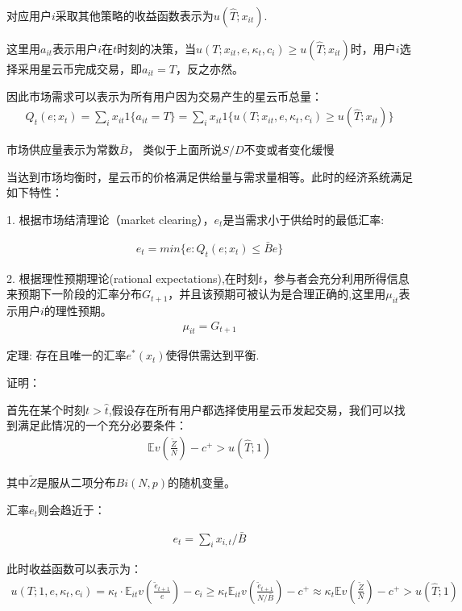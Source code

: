 对应用户$i$采取其他策略的收益函数表示为$u(\widehat{T};x_{it})$.

这里用$a_{it}$表示用户$i$在$t$时刻的决策，当$u(T;x_{it},e,\kappa_t,c_i)\geq u(\widehat{T};x_{it})$时，用户$i$选择采用星云币完成交易，即$a_{it}=T$，反之亦然。


因此市场需求可以表示为所有用户因为交易产生的星云币总量：
\begin{align}
\label{demandfunc}
Q_t(e;x_t)=\sum_ix_{it}1\{a_{it}=T\}=\sum_i x_{it}1\{u(T;x_{it},e,\kappa_t,c_i)\geq u(\widehat{T};x_{it})\}
\end{align}

市场供应量表示为常数$\bar{B}$，{\color{gray} 类似于上面所说$S/D$不变或者变化缓慢}

当达到市场均衡时，星云币的价格满足供给量与需求量相等。此时的经济系统满足如下特性：

1. 根据市场结清理论（market clearing），$e_t$是当需求小于供给时的最低汇率:

\begin{align}
\label{etfunc}
e_t=min\{e:Q_t(e;x_t)\leq\bar{B} e \}
\end{align}

2. 根据理性预期理论(rational expectations),在时刻$t$，参与者会充分利用所得信息来预期下一阶段的汇率分布$G_{t+1}$，并且该预期可被认为是合理正确的,这里用$\mu_{it}$表示用户$i$的理性预期。
\begin{align}
\label{me_func}
\mu_{it}=G_{t+1}
\end{align}



定理: 存在且唯一的汇率$e^{*}(x_t)$使得供需达到平衡.


证明：

首先在某个时刻$t>\hat{t}$,假设存在所有用户都选择使用星云币发起交易，我们可以找到满足此情况的一个充分必要条件：
\begin{align}
\mathbb{E}v(\frac{\widetilde{Z}}{N})-c^+>u(\widehat{T};1)
\end{align}

其中$\widetilde{Z}$是服从二项分布$Bi(N,p)$的随机变量。



汇率$e_t$则会趋近于：

\begin{align}
e_t=\sum_i x_{i,t} / \bar{B}
\end{align}

此时收益函数可以表示为：
\begin{align}
u(T;1,e,\kappa_t,c_i)=\kappa_t \cdot \mathbb{E}_{it}v(\frac{\widetilde{e}_{t+1}}{e})-c_i\geq \kappa_t \mathbb{E}_{it}v(\frac{\widetilde{e}_{t+1}}{N/\bar{B}})-c^+ 
\approx \kappa_t \mathbb{E}v(\frac{\widetilde{Z}}{N})-c^+>u(\widehat{T};1)
\end{align}

